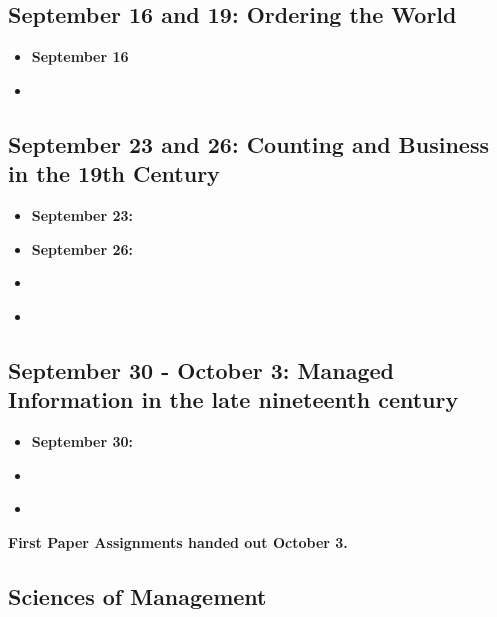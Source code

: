 \subsection{September 16 and 19: Ordering the
World}\label{september-16-and-19-ordering-the-world}

\begin{itemize}
\itemsep1pt\parskip0pt
\item
  \textbf{September 16} \cite{borges_analytical_1999}
\item
  \cite[Introduction and Chapter 3]{foucault_order_1994}
\end{itemize}

\subsection{September 23 and 26: Counting and Business in the 19th
Century}\label{september-23-and-26-counting-and-business-in-the-19th-century}

\begin{itemize}
\item
  \textbf{September 23:} \cite{edwards_early_1960}
\item
  \textbf{September 26:} \cite{garvey_facts_2013}
\item
  \cite[pp. 192-209,233-258]{fogel_time_1989}
\item
  \cite["GW Hammond, Instructions to his Overseer"]{wilentz_major_1992}
\end{itemize}

\subsection{September 30 - October 3: Managed Information in the late
nineteenth
century}\label{september-30---october-3-managed-information-in-the-late-nineteenth-century}

\begin{itemize}
\item
  \textbf{September 30:}
  \cite[Chapter 6, "Industrial Revolution and the Crisis of Control"]{beniger_control_1986}
\item
  \cite{kinnahan_charting_2008}
\item
  \cite[Chapters 3 to 5]{anderson_american_1988}
\end{itemize}

\textbf{First Paper Assignments handed out October 3.}

\subsection{Sciences of Management}\label{sciences-of-management}

